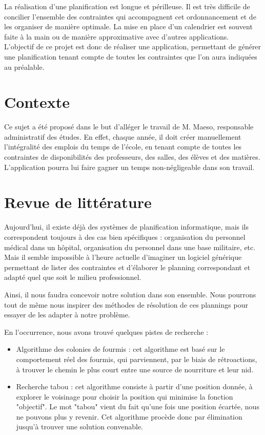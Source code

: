 \documentclass[12pt,a4paper,french]{article}
\begin{document}
La réalisation d'une planification est longue et périlleuse. Il est très difficile de concilier l'ensemble des contraintes qui accompagnent cet ordonnancement et de les organiser de manière optimale. La mise en place d'un calendrier est souvent faite à la main ou de manière approximative avec d'autres applications.\\

L'objectif de ce projet est donc de réaliser une application, permettant de générer une planification tenant compte de toutes les contraintes que l'on aura indiquées au préalable. 

\newpage
\section{Contexte}

Ce sujet a été proposé dans le but d'alléger le travail de M. Maeso, responsable administratif des études. En effet, chaque année, il doit créer manuellement l'intégralité des emplois du temps de l'école, en tenant compte de toutes les contraintes de disponibilités des professeurs, des salles, des élèves et des matières. L'application pourra lui faire gagner un temps non-négligeable dans son travail.

\newpage
\section{Revue de littérature}

Aujourd'hui, il existe déjà des systèmes de planification informatique, mais ils correspondent toujours à des cas bien spécifiques : organisation du personnel médical dans un hôpital, organisation du personnel dans une base militaire, etc. Mais il semble impossible à l'heure actuelle d'imaginer un logiciel générique permettant de lister des contraintes et d'élaborer le planning correspondant et adapté quel que soit le milieu professionnel.

Ainsi, il nous faudra concevoir notre solution dans son ensemble. Nous pourrons tout de même nous inspirer des méthodes de résolution de ces plannings pour essayer de les adapter à notre problème.

En l'occurrence, nous avons trouvé quelques pistes de recherche :
\begin{itemize}
\item Algorithme des colonies de fourmis : cet algorithme est basé sur le comportement réel des fourmis, qui parviennent, par le biais de rétroactions, à trouver le chemin le plus court entre une source de nourriture et leur nid.
\cite{02-algoFourmis}
\item Recherche tabou : cet algorithme consiste à partir d'une position donnée, à explorer le voisinage pour choisir la position qui minimise la fonction "objectif". Le mot "tabou" vient du fait qu'une fois une position écartée, nous ne pouvons plus y revenir. Cet algorithme procède donc par élimination jusqu'à trouver une solution convenable.
\cite{03-algoTabou}
\end{itemize}
\end{document}
